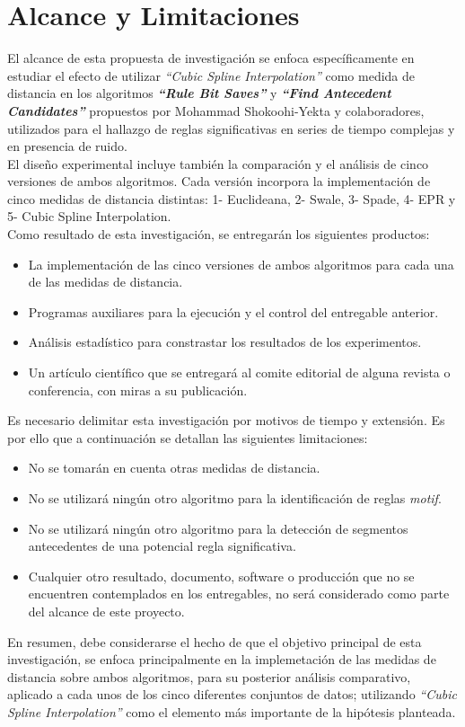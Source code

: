 \section{\textbf{Alcance y Limitaciones}}
El alcance de esta propuesta de investigaci\'on se enfoca espec\'ificamente en estudiar el efecto de utilizar \textit{\enquote{Cubic Spline Interpolation}} como medida de distancia en los algoritmos \textit{\textbf{\enquote{Rule Bit Saves}}} y \textit{\textbf{\enquote{Find Antecedent Candidates}}} propuestos por Mohammad Shokoohi-Yekta y colaboradores, utilizados para el hallazgo de reglas significativas en series de tiempo complejas y en presencia de ruido.\\
El dise\~no experimental incluye tambi\'en la comparaci\'on y el an\'alisis de cinco versiones de ambos algoritmos. Cada versi\'on incorpora la implementaci\'on de cinco medidas de distancia distintas: 1- Euclideana, 2- Swale, 3- Spade, 4- EPR y 5- Cubic Spline Interpolation.\\
Como resultado de esta investigaci\'on, se entregar\'an los siguientes productos:
\begin{itemize}
\item La implementaci\'on de las cinco versiones de ambos algoritmos para cada una de las medidas de distancia.
\item Programas auxiliares para la ejecuci\'on y el control del entregable anterior.
\item An\'alisis estad\'istico para constrastar los resultados de los experimentos.
\item Un art\'iculo cient\'ifico que se entregar\'a al comite editorial de alguna revista o conferencia, con miras a su publicaci\'on.
\end{itemize}
Es necesario delimitar esta investigaci\'on por motivos de tiempo y extensi\'on. Es por ello que a continuaci\'on se detallan las siguientes limitaciones:
\begin{itemize}
\item No se tomar\'an en cuenta otras medidas de distancia.
\item No se utilizar\'a ning\'un otro algoritmo para la identificaci\'on de reglas \textit{motif}.
\item No se utilizar\'a ning\'un otro algoritmo para la detecci\'on de segmentos antecedentes de una potencial regla significativa.
\item Cualquier otro resultado, documento, software o producci\'on que no se encuentren contemplados en los entregables, no ser\'a considerado como parte del alcance de este proyecto.
\end{itemize}
En resumen, debe considerarse el hecho de que el objetivo principal de esta investigaci\'on, se enfoca principalmente en la implemetaci\'on de las medidas de distancia sobre ambos algoritmos, para su posterior an\'alisis comparativo, aplicado a cada unos de los cinco diferentes conjuntos de datos; utilizando \textit{\enquote{Cubic Spline Interpolation}} como el elemento m\'as importante de la hip\'otesis planteada.